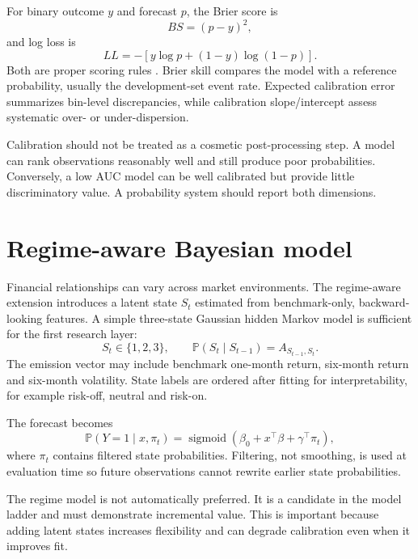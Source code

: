 \documentclass[11pt]{article}
\newcommand{\Prb}{\mathbb{P}}
\newcommand{\sigmoid}{\operatorname{sigmoid}}
\begin{document}
For binary outcome $y$ and forecast $p$, the Brier score is
\begin{equation}
BS=(p-y)^2,
\end{equation}
and log loss is
\begin{equation}
LL=-\left[y\log p+(1-y)\log(1-p)\right].
\end{equation}
Both are proper scoring rules \citep{brier1950verification,gneiting2007proper}. Brier skill compares the model with a reference probability, usually the development-set event rate. Expected calibration error summarizes bin-level discrepancies, while calibration slope/intercept assess systematic over- or under-dispersion.

Calibration should not be treated as a cosmetic post-processing step. A model can rank observations reasonably well and still produce poor probabilities. Conversely, a low AUC model can be well calibrated but provide little discriminatory value. A probability system should report both dimensions.

\section{Regime-aware Bayesian model}
Financial relationships can vary across market environments. The regime-aware extension introduces a latent state $S_t$ estimated from benchmark-only, backward-looking features. A simple three-state Gaussian hidden Markov model is sufficient for the first research layer:
\begin{equation}
S_t\in\{1,2,3\},\qquad \Prb(S_t\mid S_{t-1})=A_{S_{t-1},S_t}.
\end{equation}
The emission vector may include benchmark one-month return, six-month return and six-month volatility. State labels are ordered after fitting for interpretability, for example risk-off, neutral and risk-on.

The forecast becomes
\begin{equation}
\Prb(Y=1\mid x,\pi_t)=\sigmoid(\beta_0+x^\top\beta+\gamma^\top\pi_t),
\end{equation}
where $\pi_t$ contains filtered state probabilities. Filtering, not smoothing, is used at evaluation time so future observations cannot rewrite earlier state probabilities.

The regime model is not automatically preferred. It is a candidate in the model ladder and must demonstrate incremental value. This is important because adding latent states increases flexibility and can degrade calibration even when it improves fit.
\end{document}
